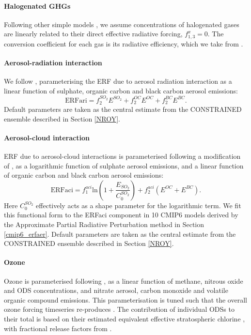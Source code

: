 \documentclass[gmd, manuscript]{copernicus}
\begin{document}
\paragraph*{Halogenated GHGs}
Following other simple models \citep{Smith2018,Meinshausen2011}, we assume concentrations of halogenated gases are linearly related to their direct effective radiative forcing, $f_{1,3}^x=0$. The conversion coefficient for each gas is its radiative efficiency, which we take from \cite{WMOAppA}.
\paragraph*{Aerosol-radiation interaction}
We follow \cite{Smith2020a}, parameterising the ERF due to aerosol radiation interaction as a linear function of sulphate, organic carbon and black carbon aerosol emissions: 
\begin{equation}
    \text{ERFari}= f_2^{SO_2} E^{SO_2} + f_2^{OC} E^{OC} + f_2^{BC} E^{BC}. \label{eq:ERFari}
\end{equation}
Default parameters are taken as the central estimate from the CONSTRAINED ensemble described in Section \ref{NROY}.
\paragraph*{Aerosol-cloud interaction}
ERF due to aerosol-cloud interactions is parameterised following a modification of \cite{Smith2020a}, as a logarithmic function of sulphate aerosol emissions, and a linear function of organic carbon and black carbon aerosol emissions: 
\begin{equation}
    \text{ERFaci}= f_1^{aci}\text{ln}\left(1+\frac{E_{SO_2}}{C_0^{SO_2}}\right)+f_2^{aci}(E^{OC}+E^{BC}). \label{eq:ERFaci}
\end{equation}
Here $C_0^{SO_2}$ effectively acts as a shape parameter for the logarithmic term. We fit this functional form to the ERFaci component in 10 CMIP6 models derived by the Approximate Partial Radiative Perturbation method \citep{Zelinka2014} in Section \ref{cmip6_erfaer}. Default parameters are taken as the central estimate from the CONSTRAINED ensemble described in Section \ref{NROY}.

\paragraph*{Ozone}
Ozone is parameterised following \cite{Thornhill2021}, as a linear function of methane, nitrous oxide and ODS concentrations, and nitrate aerosol, carbon monoxide and volatile organic compound emissions. This parameterisation is tuned such that the overall ozone forcing timeseries re-produces \cite{Skeie2020}. The contribution of individual ODSs to their total is based on their estimated equivalent effective stratospheric chlorine \citep{Newman2007,Velders2014,Smith2018}, with fractional release factors from \cite{Engel2018}.
\end{document}
